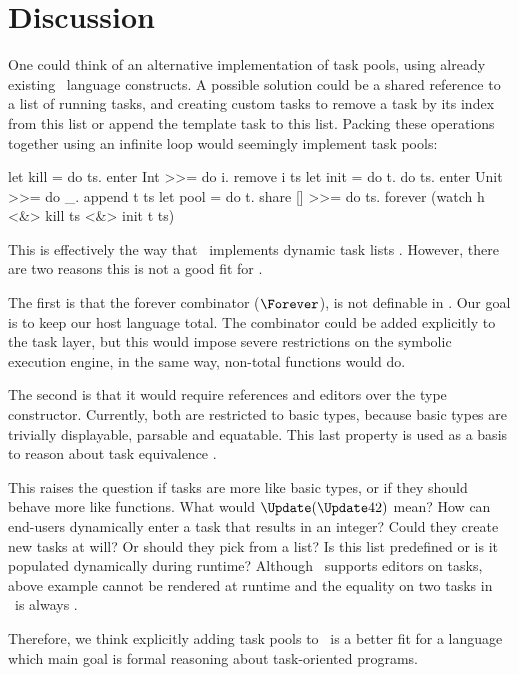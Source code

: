 
\section{Discussion}
\label{sec:discussion}


One could think of an alternative implementation of task pools,
using already existing \TOPHAT\ language constructs.
A possible solution could be a shared reference to a list of running tasks,
and creating custom tasks to remove a task by its index from this list
or append the template task to this list.
Packing these operations together using an infinite loop would seemingly implement task pools:
\begin{TASK}
  let kill = do ts. enter Int >>= do i. remove i ts
  let init = do t. do ts. enter Unit >>= do _. append t ts
  let pool = do t.
    share [] >>= do ts.
    forever (watch h <&> kill ts <&> init t ts)
\end{TASK}
This is effectively the way that \ITASKS\ implements dynamic task lists \cite{conf/pepm/PlasmeijerAKLNG11}.
However, there are two reasons this is not a good fit for \TOPHAT.

The first is that the forever combinator ($\Forever$), is not definable in \TOPHAT.
Our goal is to keep our host language total.
The combinator could be added explicitly to the task layer,
but this would impose severe restrictions on the symbolic execution engine,
in the same way, non-total functions would do.

The second is that it would require references and editors over the  type constructor.
Currently, both are restricted to basic types,
because basic types are trivially displayable, parsable and equatable.
This last property is used as a basis to reason about task equivalence \cite{conf/sfp/KlijnsmaS22}.

This raises the question if tasks are more like basic types, or if they should behave more like functions.
What would $\Update (\Update 42)$ mean?
How can end-users dynamically enter a task that results in an integer?
Could they create new tasks at will?
Or should they pick from a list?
Is this list predefined or is it populated dynamically during runtime?
Although \ITASKS\ supports editors on tasks,
above example cannot be rendered at runtime and the equality on two tasks in \ITASKS\ is always .

Therefore, we think explicitly adding task pools to \TOPHAT\ is a better fit for a language which main goal is formal reasoning about task-oriented programs.
